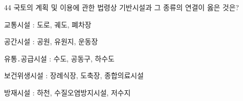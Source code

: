 \begin{question}{44}
국토의 계획 및 이용에 관한 법령상 기반시설과 그 종류의 연결이 옳은 것은?
\begin{choices}
  \item 교통시설 : 도로, 궤도, 폐차장
  \item 공간시설 : 공원, 유원지, 운동장
  \item 유통․공급시설 : 수도, 공동구, 하수도
  \item 보건위생시설 : 장례식장, 도축장, 종합의료시설
  \item 방재시설 : 하천, 수질오염방지시설, 저수지
\end{choices}
\end{question}
